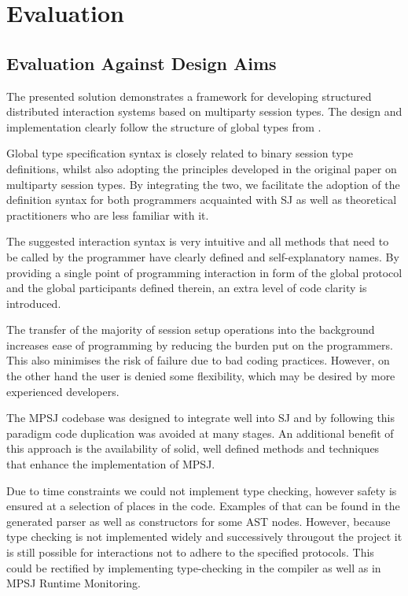 \cleardoublepage
\chapter{Evaluation}
\label{ch:evaluation}

\section{Evaluation Against Design Aims} 

The presented solution demonstrates a framework for developing structured distributed interaction systems based on multiparty session types. The design and implementation clearly follow the structure of global types from \cite{multiparty_sess_types}.

Global type specification syntax is closely related to binary session type definitions, whilst also adopting the principles developed in the original paper on multiparty session types. By integrating the two, we facilitate the adoption of the definition syntax for both programmers acquainted with SJ as well as theoretical practitioners who are less familiar with it. 

The suggested interaction syntax is very intuitive and all methods that need to be called by the programmer have clearly defined and self-explanatory names. By providing a single point of programming interaction in form of the global protocol and the global participants defined therein, an extra level of code clarity is introduced.

The transfer of the majority of session setup operations into the background increases ease of programming by reducing the burden put on the programmers. This also minimises the risk of failure due to bad coding practices. However, on the other hand the user is denied some flexibility, which may be desired by more experienced developers.

The MPSJ codebase was designed to integrate well into SJ and by following this paradigm code duplication was avoided at many stages. An additional benefit of this approach is the availability of solid, well defined methods and techniques that enhance the implementation of MPSJ.

Due to time constraints we could not implement type checking, however safety is ensured at a selection of places in the code. Examples of that can be found in the generated parser as well as constructors for some AST nodes. However, because type checking is not implemented widely and successively througout the project it is still possible for interactions not to adhere to the specified protocols. This could be rectified by implementing type-checking in the compiler as well as in MPSJ Runtime Monitoring.

